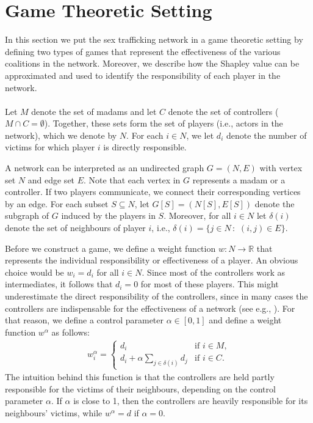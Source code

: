 \documentclass[10p]{article}
\theoremstyle{definition}
\theoremstyle{definition}
\begin{document}
\section{Game Theoretic Setting} \label{GameTheoreticalSetting}
In this section we put the sex trafficking network in a game theoretic setting by defining two types of games that represent the effectiveness of the various coalitions in the network. Moreover, we describe how the Shapley value \cite{shapley1953value} can be approximated and used to identify the responsibility of each player in the network. \\ \\
Let $M$ denote the set of madams and let $C$ denote the set of controllers ($M \cap C =\emptyset$). Together, these sets form the set of players (i.e., actors in the network), which we denote by $N$. For each $i \in N$, we let $d_i$ denote the number of victims for which player $i$ is directly responsible. 

A network can be interpreted as an undirected graph $G = (N,E)$ with vertex set $N$ and edge set $E$. Note that each vertex in $G$ represents a madam or a controller. If two players communicate, we connect their corresponding vertices by an edge. For each subset $S \subseteq N$, let $G[S] = (N[S], E[S])$ denote the subgraph of $G$ induced by the players in $S$. Moreover, for all $i \in N$ let $\delta(i)$ denote the set of neighbours of player $i$, i.e., $\delta(i) = \{ j \in N \, : \, \, (i,j) \in E\}$.

Before we construct a game, we define a weight function $w : N \rightarrow \mathbb{R}$ that represents the individual responsibility or effectiveness of a player. An obvious choice would be $w_i = d_i$ for all $i \in N$. Since most of the controllers work as intermediates, it follows that $d_i = 0$ for most of these players. This might underestimate the direct responsibility of the controllers, since in many cases the controllers are indispensable for the effectiveness of a network (see e.g., \cite{mancuso2014not}). For that reason, we define a control parameter $\alpha \in [0,1]$ and define a weight function $w^\alpha$ as follows:
\begin{align*}
    w^\alpha_i = \begin{cases} d_i & \text{if $i \in M$,} \\d_i + 
    \alpha \sum_{j \in \delta(i)}d_j & \text{if $i \in C$.}
    \end{cases}
\end{align*}
The intuition behind this function is that the controllers are held partly responsible for the victims of their neighbours, depending on the control parameter $\alpha$. If $\alpha$ is close to 1, then the controllers are heavily responsible for its neighbours' victims, while $w^\alpha = d$ if $\alpha = 0$.
\end{document}
